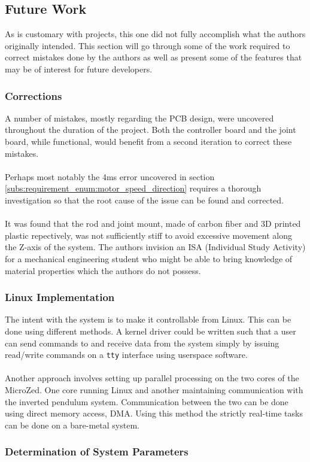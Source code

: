 \subsection{Future Work}
\label{sub:future_work}
As is customary with projects, this one did not fully accomplish what the authors originally intended.
This section will go through some of the work required to correct mistakes done by the authors as well as present some of the features that may be of interest for future developers.

\subsubsection{Corrections} %
\label{ssub:corrections}
A number of mistakes, mostly regarding the PCB design, were uncovered throughout the duration of the project.
Both the controller board and the joint board, while functional, would benefit from a second iteration to correct these mistakes.
\\~\\
Perhaps most notably the 4ms error uncovered in section \ref{subs:requirement_enum:motor_speed_direction} requires a thorough investigation so that the root cause of the issue can be found and corrected. 
\\~\\
It was found that the rod and joint mount, made of carbon fiber and 3D printed plastic repectively, was not sufficiently stiff to avoid excessive movement along the Z-axis of the system.
The authors invision an ISA (Individual Study Activity) for a mechanical engineering student who might be able to bring knowledge of material properties which the authors do not possess.
\subsubsection{Linux Implementation} %
\label{ssub:linux_implementation}
The intent with the system is to make it controllable from Linux.
This can be done using different methods.
A kernel driver could be written such that a user can send commands to and receive data from the system simply by issuing read/write commands on a \texttt{tty} interface using userspace software.
\\~\\
Another approach involves setting up parallel processing on the two cores of the MicroZed.
One core running Linux and another maintaining communication with the inverted pendulum system.
Communication between the two can be done using direct memory access, DMA.
Using this method the strictly real-time tasks can be done on a bare-metal system.
\subsubsection{Determination of System Parameters} %
\label{ssub:determination_of_system_parameters}
